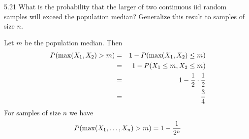 \documentclass[12pt]{article}
\begin{document}
5.21
What is the probability that the larger of two continuous iid random
samples will exceed the population median? Generalize this result
to samples of size $n$.

\bigskip
\noindent
Let $m$ be the population median.
Then
\begin{eqnarray*}
P(\max(X_1,X_2)>m)&=&1-P(\max(X_1,X_2)\le m)\\
&=&1-P(X_1\le m, X_2\le m)\\
&=&1-{1\over2}\cdot{1\over2}\\
&=&{3\over4}
\end{eqnarray*}
For samples of size $n$ we have
$$P(\max(X_1,\ldots,X_n)>m)=1-{1\over2^n}$$
\end{document}
